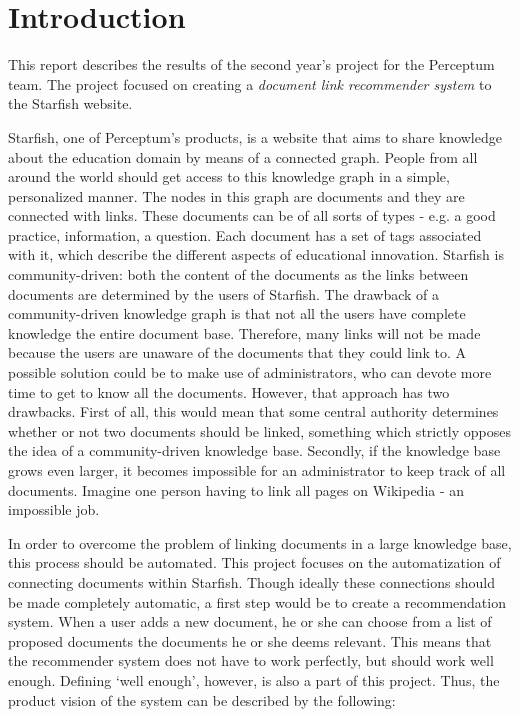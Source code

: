 

\section{Introduction}

This report describes the results of the second year's project for the Perceptum team. The project focused on creating a \emph{document link recommender system} to the Starfish website. 

Starfish, one of Perceptum's products, is a website that aims to share knowledge about the education domain by means of a connected graph. People from all around the world should get access to this knowledge graph in a simple, personalized manner. The nodes in this graph are documents and they are connected with links. These documents can be of all sorts of types - e.g. a good practice, information, a question. Each document has a set of tags associated with it, which describe the different aspects of educational innovation. Starfish is community-driven: both the content of the documents as the links between documents are determined by the users of Starfish. The drawback of a community-driven knowledge graph is that not all the users have complete knowledge the entire document base. Therefore, many links will not be made because the users are unaware of the documents that they could link to. A possible solution could be to make use of administrators, who can devote more time to get to know all the documents. However, that approach has two drawbacks. First of all, this would mean that some central authority determines whether or not two documents should be linked, something which strictly opposes the idea of a community-driven knowledge base. Secondly, if the knowledge base grows even larger, it becomes impossible for an administrator to keep track of all documents. Imagine one person having to link all pages on Wikipedia - an impossible job. 

In order to overcome the problem of linking documents in a large knowledge base, this process should be automated. This project focuses on the automatization of connecting documents within Starfish. Though ideally these connections should be made completely automatic, a first step would be to create a recommendation system. When a user adds a new document, he or she can choose from a list of proposed documents the documents he or she deems relevant. This means that the recommender system does not have to work perfectly, but should work well enough. Defining `well enough', however, is also a part of this project. Thus, the product vision of the system can be described by the following:

